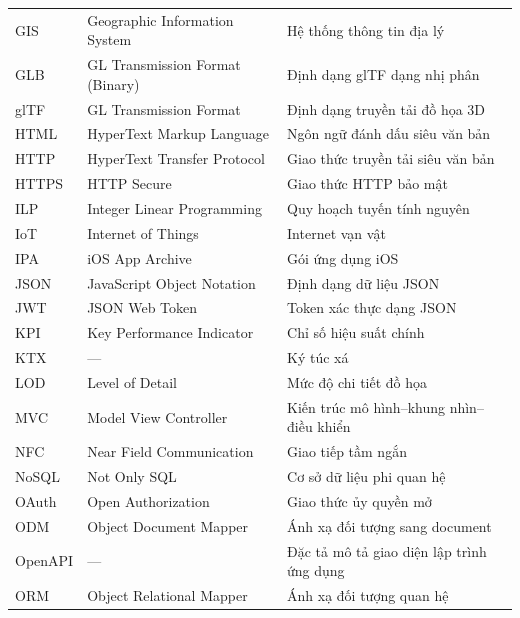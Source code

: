 \documentclass[../DoAn.tex]{subfiles}
\begin{document}
\begin{longtable}{p{3cm} p{5cm} p{6cm}}
    GIS     & Geographic Information System      & Hệ thống thông tin địa lý \\[3pt]
    GLB     & GL Transmission Format (Binary)    & Định dạng glTF dạng nhị phân \\[3pt]
    glTF    & GL Transmission Format             & Định dạng truyền tải đồ họa 3D \\[3pt]
    HTML    & HyperText Markup Language          & Ngôn ngữ đánh dấu siêu văn bản \\[3pt]
    HTTP    & HyperText Transfer Protocol        & Giao thức truyền tải siêu văn bản \\[3pt]
    HTTPS   & HTTP Secure                        & Giao thức HTTP bảo mật \\[3pt]
    ILP     & Integer Linear Programming         & Quy hoạch tuyến tính nguyên \\[3pt]
    IoT     & Internet of Things                 & Internet vạn vật \\[3pt]
    IPA     & iOS App Archive                    & Gói ứng dụng iOS \\[3pt]
    JSON    & JavaScript Object Notation         & Định dạng dữ liệu JSON \\[3pt]
    JWT     & JSON Web Token                     & Token xác thực dạng JSON \\[3pt]
    KPI     & Key Performance Indicator          & Chỉ số hiệu suất chính \\[3pt]
    KTX     & ---                                & Ký túc xá \\[3pt]
    LOD     & Level of Detail                    & Mức độ chi tiết đồ họa \\[3pt]
    MVC     & Model View Controller              & Kiến trúc mô hình--khung nhìn--điều khiển \\[3pt]
    NFC     & Near Field Communication           & Giao tiếp tầm ngắn \\[3pt]
    NoSQL   & Not Only SQL                       & Cơ sở dữ liệu phi quan hệ \\[3pt]
    OAuth   & Open Authorization                 & Giao thức ủy quyền mở \\[3pt]
    ODM     & Object Document Mapper             & Ánh xạ đối tượng sang document \\[3pt]
    OpenAPI & ---                                & Đặc tả mô tả giao diện lập trình ứng dụng \\[3pt]
    ORM     & Object Relational Mapper           & Ánh xạ đối tượng quan hệ \\[3pt]

\end{longtable}
\end{document}
